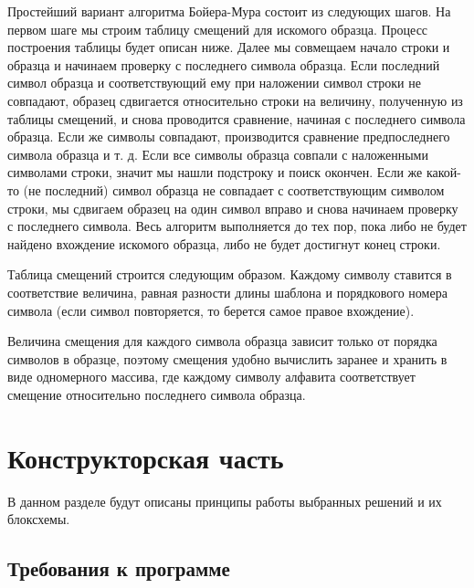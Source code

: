 \documentclass[a4paper,14pt]{report}
\begin{document}
Простейший вариант алгоритма Бойера-Мура состоит из следующих шагов. На первом шаге мы строим таблицу смещений для искомого образца. Процесс построения таблицы будет описан ниже. Далее мы совмещаем начало строки и образца и начинаем проверку с последнего символа образца. Если последний символ образца и соответствующий ему при наложении символ строки не совпадают, образец сдвигается относительно строки на величину, полученную из таблицы смещений, и снова проводится сравнение, начиная с последнего символа образца. Если же символы совпадают, производится сравнение предпоследнего символа образца и т. д. Если все символы образца совпали с наложенными символами строки, значит мы нашли подстроку и поиск окончен. Если же какой-то (не последний) символ образца не совпадает с соответствующим символом строки, мы сдвигаем образец на один символ вправо и снова начинаем проверку с последнего символа. Весь алгоритм выполняется до тех пор, пока либо не будет найдено вхождение искомого образца, либо не будет достигнут конец строки.


Таблица смещений строится следующим образом. Каждому символу ставится в соответствие величина, равная разности длины шаблона и порядкового номера символа (если символ повторяется, то берется самое правое вхождение).

Величина смещения для каждого символа образца зависит только от порядка символов в образце, поэтому смещения удобно вычислить заранее и хранить в виде одномерного массива, где каждому символу алфавита соответствует смещение относительно последнего символа образца.

\chapter*{Конструкторская часть}

В данном разделе будут описаны принципы работы выбранных решений и их блоксхемы.

\section*{Требования к программе}
\end{document}
